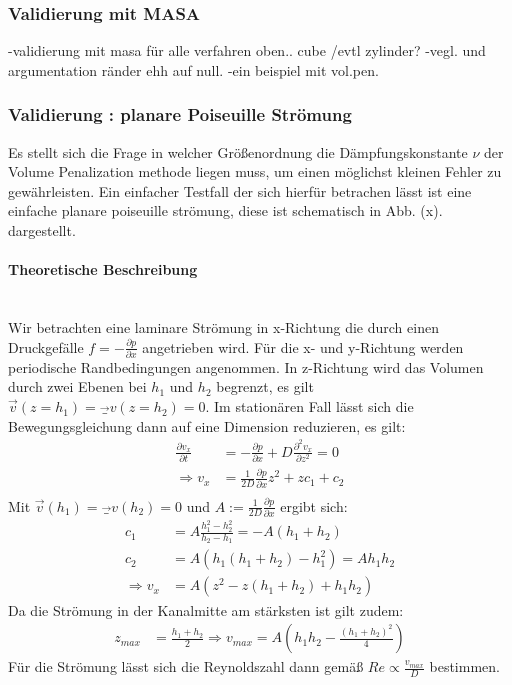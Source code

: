 \subsubsection{Validierung mit MASA}
-validierung mit masa für alle verfahren oben.. cube /evtl zylinder?
-vegl. und argumentation ränder ehh auf null.
-ein beispiel mit vol.pen.

\subsubsection{Validierung : planare Poiseuille Strömung}
Es stellt sich die Frage in welcher Größenordnung die Dämpfungskonstante $\nu$ der Volume Penalization methode liegen muss, um einen möglichst kleinen
Fehler zu gewährleisten. Ein einfacher Testfall der sich hierfür betrachen lässt ist eine einfache planare poiseuille strömung, diese ist schematisch in Abb. (x). dargestellt.
\paragraph*{Theoretische Beschreibung}\mbox{}\\
Wir betrachten eine laminare Strömung in x-Richtung die durch einen Druckgefälle $f=-\frac{\partial p}{\partial x}$ angetrieben wird.
Für die x- und y-Richtung werden periodische Randbedingungen angenommen. In z-Richtung wird das Volumen durch zwei Ebenen bei $h_1$ und $h_2$ begrenzt,
es gilt $\vec{v}(z=h_1) = \vec_{v}(z=h_2) = 0$.
Im stationären Fall lässt sich  die Bewegungsgleichung dann  auf eine Dimension reduzieren, es gilt:
\begin{align}
\frac{\partial v_x}{\partial t} &= - \frac{\partial p}{\partial x} + D \frac{\partial^2 v_x}{\partial z^2} = 0 \\
\Rightarrow v_x &= \frac{1}{2D}\frac{\partial p}{\partial x}z^2 + zc_1 + c_2\\
\end{align}
Mit $\vec{v}(h_1) = \vec_{v}(h_2) = 0$ und $A:=\frac{1}{2D}\frac{\partial p}{\partial x}$ ergibt sich:
\begin{align}
c_1 &= A\frac{h_1^2 -h_2^2}{h_2 - h_1} = -A(h_1+h_2)\\
c_2 &= A(h_1(h_1 + h_2) - h_1^2) = Ah_1h_2\\
\Rightarrow v_x &= A(z^2 - z(h_1 + h_2) + h_1h_2)
\end{align}
Da die Strömung in der Kanalmitte am stärksten ist gilt zudem:
\begin{align}
z_{max} &= \frac{h_1+h_2}{2}\Rightarrow v_{max} = A\left(h_1h_2 - \frac{(h_1 + h_2)^2}{4}\right)
\end{align}
Für die Strömung lässt sich die Reynoldszahl dann gemäß $Re \propto \frac{v_{max}}{D}$  bestimmen.

